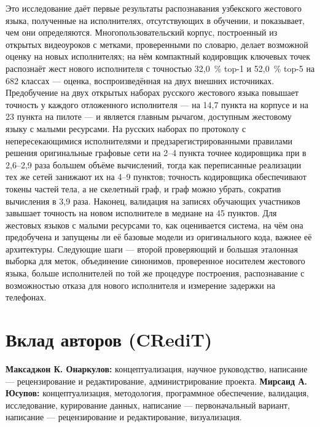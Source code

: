\documentclass[a4paper,fleqn]{cas-dc}
\begin{document}
Это исследование даёт первые результаты распознавания узбекского жестового языка, полученные на исполнителях, отсутствующих в обучении, и показывает, чем они определяются. Многопользовательский корпус, построенный из открытых видеоуроков с метками, проверенными по словарю, делает возможной оценку на новых исполнителях; на нём компактный кодировщик ключевых точек распознаёт жест нового исполнителя с точностью 32,0~\% top-1 и 52,0~\% top-5 на 682 классах --- оценка, воспроизведённая на двух внешних источниках. Предобучение на двух открытых наборах русского жестового языка повышает точность у каждого отложенного исполнителя --- на 14,7 пункта на корпусе и на 23 пункта на пилоте --- и является главным рычагом, доступным жестовому языку с малыми ресурсами. На русских наборах по протоколу с непересекающимися исполнителями и предзарегистрированными правилами решения оригинальные графовые сети на 2--4 пункта точнее кодировщика при в 2,6--2,9 раза большем объёме вычислений, тогда как переписанные реализации тех же сетей занижают их на 4--9 пунктов; точность кодировщика обеспечивают токены частей тела, а не скелетный граф, и граф можно убрать, сократив вычисления в 3,9 раза. Наконец, валидация на записях обучающих участников завышает точность на новом исполнителе в медиане на 45 пунктов. Для жестовых языков с малыми ресурсами то, как оценивается система, на чём она предобучена и запущены ли её базовые модели из оригинального кода, важнее её архитектуры. Следующие шаги --- второй проверяющий и большая эталонная выборка для меток, объединение синонимов, проверенное носителем жестового языка, больше исполнителей по той же процедуре построения, распознавание с возможностью отказа для нового исполнителя и измерение задержки на телефонах.

\hypertarget{ux432ux43aux43bux430ux434-ux430ux432ux442ux43eux440ux43eux432-credit}{%
\section*{Вклад авторов (CRediT)}\label{ux432ux43aux43bux430ux434-ux430ux432ux442ux43eux440ux43eux432-credit}}

\textbf{Максаджон К. Онаркулов:} концептуализация, научное руководство, написание --- рецензирование и редактирование, администрирование проекта. \textbf{Мирсаид А. Юсупов:} концептуализация, методология, программное обеспечение, валидация, исследование, курирование данных, написание --- первоначальный вариант, написание --- рецензирование и редактирование, визуализация.
\end{document}
